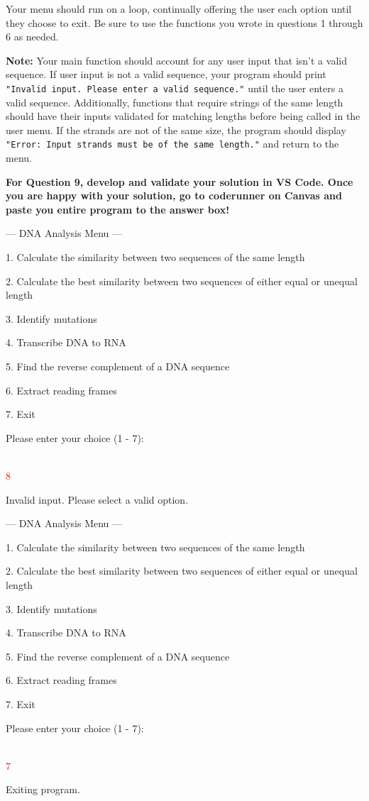 Your menu should run on a loop, continually offering the user each option until they choose to exit. Be sure to use the functions you wrote in questions 1 through 6 as needed.

\hspace{5pt}

\textbf{Note:} Your main function should account for any user input that isn't a valid sequence. If user input is not a valid sequence, your program should print \texttt{"Invalid input. Please enter a valid sequence."} until the user enters a valid sequence. Additionally, functions that require strings of the same length should have their inputs validated for matching lengths before being called in the user menu. If the strands are not of the same size, the program should display \texttt{"Error: Input strands must be of the same length."} and return to the menu.

\textbf{For Question 9, develop and validate your solution in VS Code. Once you are happy with your solution, go to coderunner on Canvas and paste you entire program to the answer box!} 

\begin{sample}

    --- DNA Analysis Menu ---
    
    1. Calculate the similarity between two sequences of the same length
    
    2. Calculate the best similarity between two sequences of either equal or unequal length
    
    3. Identify mutations
    
    4. Transcribe DNA to RNA
    
    5. Find the reverse complement of a DNA sequence

    6. Extract reading frames
    
    7. Exit
    
    Please enter your choice (1 - 7): 
    
    \\\textcolor{red}{8}
    
    Invalid input. Please select a valid option.
    
    --- DNA Analysis Menu ---
    
    1. Calculate the similarity between two sequences of the same length
   
    2. Calculate the best similarity between two sequences of either equal or unequal length
    
    3. Identify mutations
    
    4. Transcribe DNA to RNA
    
    5. Find the reverse complement of a DNA sequence

    6. Extract reading frames
    
    7. Exit
    
    Please enter your choice (1 - 7): 
    
    \\\textcolor{red}{7}
    
    Exiting program.
\end{sample}


